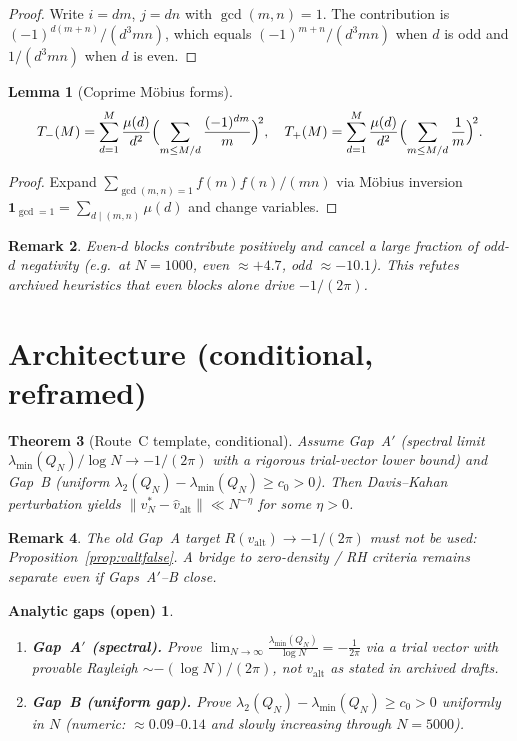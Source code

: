 \documentclass[11pt]{article}
\newtheorem{theorem}{Theorem}[section]
\newtheorem{lemma}[theorem]{Lemma}
\newtheorem{remark}[theorem]{Remark}
\newtheorem*{gap}{Analytic gaps (open)}
\begin{document}
\begin{proof}
Write $i=dm$, $j=dn$ with $\gcd(m,n)=1$. The contribution is
$(-1)^{d(m+n)}/(d^3 mn)$, which equals $(-1)^{m+n}/(d^3 mn)$ when $d$ is odd
and $1/(d^3 mn)$ when $d$ is even.
\end{proof}

\begin{lemma}[Coprime M\"obius forms]\label{lem:mobiusT}
\[
T_-(M)=\sum_{d=1}^M\frac{\mu(d)}{d^2}
\Bigl(\sum_{m\le M/d}\frac{(-1)^{dm}}{m}\Bigr)^{\!2},\quad
T_+(M)=\sum_{d=1}^M\frac{\mu(d)}{d^2}
\Bigl(\sum_{m\le M/d}\frac1m\Bigr)^{\!2}.
\]
\end{lemma}

\begin{proof}
Expand $\sum_{\gcd(m,n)=1} f(m)f(n)/(mn)$ via M\"obius inversion
$\mathbf 1_{\gcd=1}=\sum_{d\mid(m,n)}\mu(d)$ and change variables.
\end{proof}

\begin{remark}
Even-$d$ blocks contribute \emph{positively} and cancel a large fraction of
odd-$d$ negativity (e.g.\ at $N=1000$, even $\approx +4.7$, odd $\approx -10.1$).
This refutes archived heuristics that even blocks alone drive $-1/(2\pi)$.
\end{remark}

\section{Architecture (conditional, reframed)}

\begin{theorem}[Route~C template, conditional]
Assume Gap~A$'$ (spectral limit
$\lambda_{\min}(Q_N)/\log N\to -1/(2\pi)$ with a rigorous trial-vector lower bound)
and Gap~B (uniform $\lambda_2(Q_N)-\lambda_{\min}(Q_N)\ge c_0>0$).
Then Davis--Kahan perturbation yields
$\|v_N^*-\hat v_{\mathrm{alt}}\|\ll N^{-\eta}$ for some $\eta>0$.
\end{theorem}

\begin{remark}
The old Gap~A target $R(v_{\mathrm{alt}})\to -1/(2\pi)$ must not be used:
Proposition~\ref{prop:valtfalse}. A bridge to zero-density / RH criteria remains
separate even if Gaps~A$'$--B close.
\end{remark}

\begin{gap}
\begin{enumerate}[leftmargin=1.2em]
\item \textbf{Gap~A$'$ (spectral).}
Prove $\displaystyle\lim_{N\to\infty}\frac{\lambda_{\min}(Q_N)}{\log N}=-\frac{1}{2\pi}$
via a trial vector with provable Rayleigh $\sim -(\log N)/(2\pi)$,
\emph{not} $v_{\mathrm{alt}}$ as stated in archived drafts.
\item \textbf{Gap~B (uniform gap).}
Prove $\lambda_2(Q_N)-\lambda_{\min}(Q_N)\ge c_0>0$ uniformly in $N$
(numeric: $\approx 0.09$--$0.14$ and slowly increasing through $N=5000$).
\end{enumerate}
\end{gap}
\end{document}
